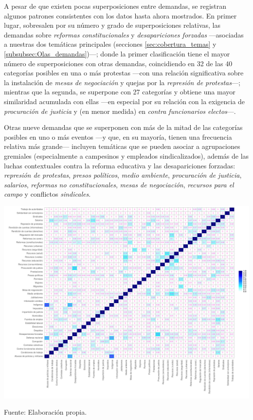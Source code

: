 \documentclass[letterpaper, 11pt]{book}
\theoremstyle{definition}
\theoremstyle{remark}
\newenvironment{changemargin}[2]{%
\begin{list}{}{%
\setlength{\topsep}{0pt}%
\setlength{\leftmargin}{#1}%
\setlength{\rightmargin}{#2}%
\setlength{\listparindent}{\parindent}%
\setlength{\itemindent}{\parindent}%
\setlength{\parsep}{\parskip}%
}%
\item[]}{\end{list}}
\begin{document}
A pesar de que existen pocas superposiciones entre demandas, se registran algunos patrones consistentes con los datos hasta ahora mostrados. 
En primer lugar, sobresalen por su número y grado de superposiciones relativas, las demandas sobre \emph{reformas constitucionales} y \emph{desapariciones forzadas} ---asociadas a nuestras dos temáticas principales (secciones \ref{sec:cobertura_temas} y \ref{subsubsec:Olas_demandas})---; donde la primer clasificación tiene el mayor número de superposiciones con otras demandas, coincidiendo en 32 de las 40 categorías posibles en una o más protestas ---con una relación significativa sobre la instalación de \emph{mesas de negociación} y quejas por la \emph{represión de protestas}---; 
mientras que la segunda, se superpone con 27 categorías y obtiene una mayor similaridad acumulada con ellas ---en especial por su relación con la exigencia de \emph{procuración de justicia} y (en menor medida) en \emph{contra funcionarios electos}---. 


Otras nueve demandas que se superponen con más de la mitad de las categorías posibles en uno o más eventos ---y que, en su mayoría, tienen una frecuencia relativa más grande--- incluyen temáticas que se pueden asociar a agrupaciones gremiales (especialmente a campesinos y empleados sindicalizados), además de las luchas contextuales contra la reforma educativa y las desapariciones forzadas: \emph{represión de protestas}, \emph{presos políticos}, \emph{medio ambiente}, \emph{procuración de justicia}, \emph{salarios}, \emph{reformas no constitucionales}, \emph{mesas de negociación}, \emph{recursos para el campo} y conflictos \emph{sindicales}. 


\begin{minipage}{\linewidth}
\centering
{} \label{3.20_simJaccardDem}
  \begin{changemargin}{-1cm}{0cm}
   \includegraphics[width=0.8\paperwidth]{img/3_20_simJaccardDem.pdf} 
  \end{changemargin}
\small Fuente: Elaboración propia.
\end{minipage}\bigskip
\end{document}

